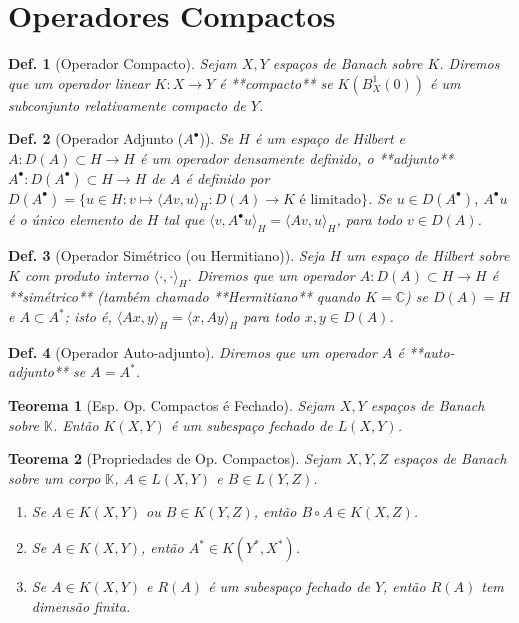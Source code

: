 \documentclass[11pt]{article}
\theoremstyle{yellowhead}
\newtheorem*{theorem}{Teorema}
\theoremstyle{yellowdef}
\newtheorem*{definition}{Def.}
\begin{document}
\section{Operadores Compactos}
\begin{multicols}{3}
\begin{definition}[Operador Compacto]
Sejam $X ,Y$ espaços de Banach sobre $K$. Diremos que um operador linear $K : X \rightarrow Y$ é **compacto** se $K (B_X^1(0))$ é um subconjunto relativamente compacto de $Y$.
\end{definition}

\begin{definition}[Operador Adjunto ($A^{\bullet}$)]
Se $H$ é um espaço de Hilbert e $A : D(A) \subset H \rightarrow H$ é um operador densamente definido, o **adjunto** $A^{\bullet} : D(A^{\bullet}) \subset H \rightarrow H$ de $A$ é definido por $D(A^{\bullet}) = \{u \in H : v \mapsto \langle Av , u\rangle_H : D(A)\rightarrow K \text{ é limitado}\}$. Se $u \in D(A^{\bullet})$, $A^{\bullet}u$ é o único elemento de $H$ tal que $\langle v ,A^{\bullet}u\rangle_H = \langle Av , u\rangle_H$, para todo $v \in D(A)$.
\end{definition}

\begin{definition}[Operador Simétrico (ou Hermitiano)]
Seja $H$ um espaço de Hilbert sobre $K$ com produto interno $\langle \cdot, \cdot \rangle_H$. Diremos que um operador $A : D(A) \subset H \rightarrow H$ é **simétrico** (também chamado **Hermitiano** quando $K = \mathbb{C}$) se $D(A) = H$ e $A \subset A^*$; isto é, $\langle Ax, y \rangle_H = \langle x, Ay \rangle_H$ para todo $x, y \in D(A)$.
\end{definition}

\begin{definition}[Operador Auto-adjunto]
Diremos que um operador $A$ é **auto-adjunto** se $A = A^*$.
\end{definition}
\begin{theorem}[Esp. Op. Compactos é Fechado]
Sejam $X, Y$ espaços de Banach sobre $\mathbb{K}$. Então $K(X, Y)$ é um subespaço fechado de $L(X, Y)$.
\end{theorem}

\begin{theorem}[Propriedades de Op. Compactos]
Sejam $X, Y, Z$ espaços de Banach sobre um corpo $\mathbb{K}$, $A \in L(X, Y)$ e $B \in L(Y, Z)$.
\begin{enumerate}[label=(\alph*)]
    \item Se $A \in K(X, Y)$ ou $B \in K(Y, Z)$, então $B \circ A \in K(X, Z)$.
    \item Se $A \in K(X, Y)$, então $A^* \in K(Y^*, X^*)$.
    \item Se $A \in K(X, Y)$ e $R(A)$ é um subespaço fechado de $Y$, então $R(A)$ tem dimensão finita.
\end{enumerate}
\end{theorem}
\end{multicols}
\end{document}
